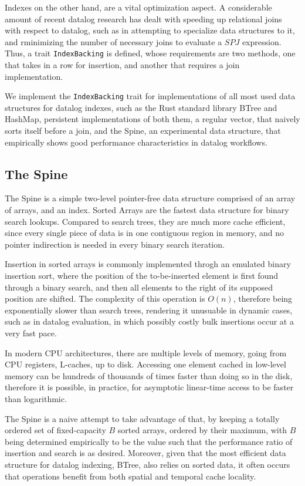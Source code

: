 \documentclass[manuscript,screen,review]{acmart}
\theoremstyle{definition}
\begin{document}
Indexes on the other hand, are a vital optimization aspect. A considerable amount of recent datalog research has dealt with speeding up relational joins
with respect to datalog, such as in attempting to specialize data structures to it\cite{souffle_btree}, and rminimizing the number of necessary
joins to evaluate a $SPJ$ expression\cite{primitive_search}. Thus, a trait \verb|IndexBacking| is defined, whose requirements are two methods, one
that takes in a row for insertion, and another that requires a join implementation.

We implement the \verb|IndexBacking| trait for implementations of all most used data structures for datalog indexes, such as the Rust standard
library BTree\cite{rust_btree} and HashMap, persistent implementations of both them, a regular vector, that naively sorts itself before a
join, and the Spine, an experimental data structure, that empirically shows good performance characteristics in datalog workflows.

\subsection{The Spine}
The Spine is a simple two-level pointer-free data structure comprised of an array of arrays, and an index. Sorted Arrays are the fastest data structure for
binary search lookups. Compared to search trees, they are much more cache efficient, since every single piece of data is in one contiguous region
in memory, and no pointer indirection is needed in every binary search iteration.

Insertion in sorted arrays is commonly implemented throgh an emulated binary insertion sort, where the position of the to-be-inserted element
is first found through a binary search, and then all elements to the right of its supposed position are shifted. The complexity of this
operation is $O(n)$, therefore being exponentially slower than search trees, rendering it unusuable in dynamic cases, such as in datalog
evaluation, in which possibly costly bulk insertions occur at a very fast pace.

In modern CPU architectures, there are multiple levels of memory, going from CPU registers, L-caches, up to disk. Accessing one element
cached in low-level memory can be hundreds of thousands of times faster than doing so in the disk, therefore it is possible, in practice, for
asymptotic linear-time access to be faster than logarithmic.

The Spine is a naive attempt to take advantage of that, by keeping a totally ordered set of fixed-capacity $B$ sorted arrays, ordered by their
maximum, with $B$ being determined empirically to be the value such that the performance ratio of insertion and search is as desired. Moreover, given
that the most efficient data structure for datalog indexing, BTree, also relies on sorted data, it often occurs that operations benefit from both
spatial and temporal cache locality.
\end{document}
